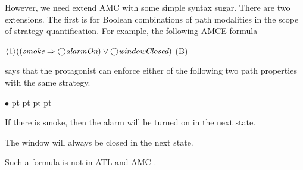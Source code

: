\documentclass[times,10pt,twocolumn]{article}
\newcommand{\nxt}{\bigcirc}
\newenvironment{list1}{\begin{list}{$\bullet$}
{\topsep 0 pt \parsep 0 pt \partopsep 0 pt \itemsep 0
pt}}{\end{list}}
\begin{document}
However, we need extend AMC with some simple syntax sugar.  
There are two extensions.  
The first is for Boolean combinations of path modalities in the 
scope of strategy quantification. 
For example, the following AMCE formula 
\begin{center} 
\hfill 
$\langle 1\rangle((\mbox{\em smoke}\Rightarrow\nxt\mbox{\em alarmOn})\vee 
\nxt\mbox{\em windowClosed})$ 
\hfill (B) 
\end{center} 
says that the protagonist can enforce either of 
the following two path properties with the same strategy. 
\begin{list1} 
\item If there is smoke, then the alarm will be turned on in the next state. 
\item The window will always be closed in the next state.  
\end{list1} 
Such a formula is not in ATL and AMC \cite{AHK02}.  
\end{document}
